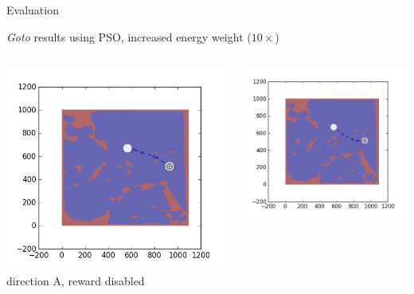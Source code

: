 \documentclass[9pt]{beamer}
\begin{document}
\begin{frame}{Evaluation}
    \begin{block}{\textit{Goto} results using PSO, increased energy weight ($10\times$)}
        \begin{columns}
            \begin{column}{0.25\textwidth}
                \begin{center}
                    \includegraphics[width=\textwidth,trim={2cm 2cm 2cm 2cm},clip]{img/EXP3RG_PathBa_-1_-1_0d001_0.png}
                    \newline
                    \tiny{direction A, reward disabled}
                \end{center}
            \end{column}
            \begin{column}{0.25\textwidth}
                \begin{center}
                    \includegraphics[width=\textwidth,trim={2cm 2cm 2cm 2cm},clip]{img/EXP3RG_PathBa_-1_-1_0d001_-1.png}

\end{center}
\end{column}
\end{columns}
\end{block}
\end{frame}
\end{document}
